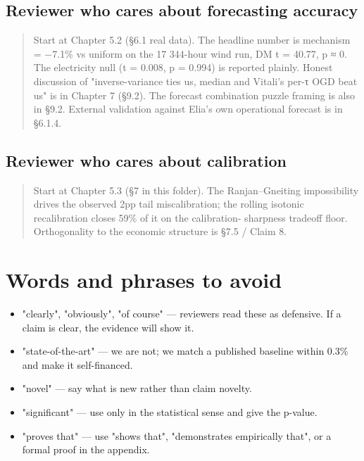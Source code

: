 \documentclass[11pt,a4paper,openany]{report}
\begin{document}
\subsection{Reviewer who cares about forecasting accuracy}

\begin{quote}
Start at Chapter 5.2 (§6.1 real data). The headline number is
mechanism = −7.1\% vs uniform on the 17 344-hour wind run, DM
t = 40.77, p ≈ 0. The electricity null (t = 0.008, p = 0.994) is
reported plainly. Honest discussion of "inverse-variance ties us,
median and Vitali's per-τ OGD beat us" is in Chapter 7 (§9.2). The
forecast combination puzzle framing is also in §9.2. External
validation against Elia's own operational forecast is in §6.1.4.

\end{quote}
\subsection{Reviewer who cares about calibration}

\begin{quote}
Start at Chapter 5.3 (§7 in this folder). The Ranjan–Gneiting
impossibility drives the observed 2pp tail miscalibration; the
rolling isotonic recalibration closes 59\% of it on the calibration-
sharpness tradeoff floor. Orthogonality to the economic structure is
§7.5 / Claim 8.

\end{quote}
\section{Words and phrases to avoid}

\begin{itemize}
  \item "clearly", "obviously", "of course" — reviewers read these as
    defensive. If a claim is clear, the evidence will show it.
  \item "state-of-the-art" — we are not; we match a published baseline within
    0.3\% and make it self-financed.
  \item "novel" — say what is new rather than claim novelty.
  \item "significant" — use only in the statistical sense and give the
    p-value.
  \item "proves that" — use "shows that", "demonstrates empirically that", or
    a formal proof in the appendix.
\end{itemize}
\end{document}
